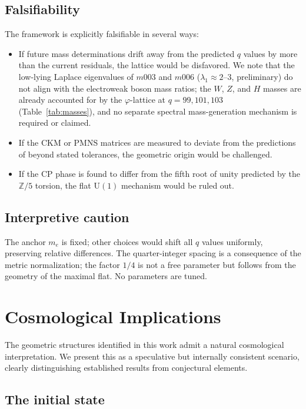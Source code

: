 \documentclass[12pt]{article}
\theoremstyle{definition}
\begin{document}
\subsection{Falsifiability}
The framework is explicitly falsifiable in several ways:
\begin{itemize}
\item If future mass determinations drift away from the predicted $q$ values by more than the current residuals, the lattice would be disfavored. We note that the low-lying Laplace eigenvalues of $m003$ and $m006$ ($\lambda_1 \approx 2$--$3$, preliminary) do not align with the electroweak boson mass ratios; the $W$, $Z$, and $H$ masses are already accounted for by the $\varphi$-lattice at $q=99,101,103$ (Table~\ref{tab:masses}), and no separate spectral mass-generation mechanism is required or claimed.
\item If the CKM or PMNS matrices are measured to deviate from the predictions of \cite{Gentry:CKM,Gentry:PMNS} beyond stated tolerances, the geometric origin would be challenged.
\item If the CP phase is found to differ from the fifth root of unity predicted by the $\mathbb{Z}/5$ torsion, the flat $\mathrm{U}(1)$ mechanism would be ruled out.
\end{itemize}

\subsection{Interpretive caution}
The anchor $m_e$ is fixed; other choices would shift all $q$ values uniformly, preserving relative differences. The quarter-integer spacing is a consequence of the metric normalization; the factor $1/4$ is not a free parameter but follows from the geometry of the maximal flat. No parameters are tuned.

\section{Cosmological Implications}
\label{sec:cosmology}

The geometric structures identified in this work admit a natural
cosmological interpretation. We present this as a speculative but
internally consistent scenario, clearly distinguishing established
results from conjectural elements.

\subsection{The initial state}
\end{document}
